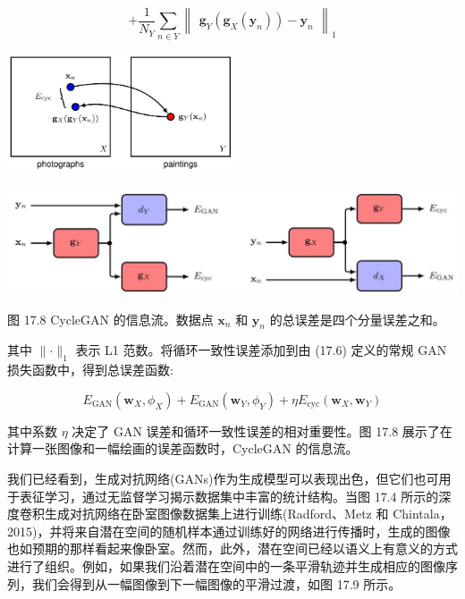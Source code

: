 \documentclass[10pt]{report}
\begin{document}
\[
+ \frac{1}{{N}_{Y}}\mathop{\sum }\limits_{{n \in  Y}}{\begin{Vmatrix}{\mathbf{g}}_{Y}\left( {\mathbf{g}}_{X}\left( {\mathbf{y}}_{n}\right) \right)  - {\mathbf{y}}_{n}\end{Vmatrix}}_{1} \tag{17.12}
\]

\begin{center}
\includegraphics[max width=0.5\textwidth]{images/0194e279-9b28-703a-88f4-c3ac21e2010d_560_831_1572_720_383_0.jpg}
\end{center}
\hspace*{3em} 

\begin{center}
\includegraphics[max width=1.0\textwidth]{images/0194e279-9b28-703a-88f4-c3ac21e2010d_561_227_342_1279_299_0.jpg}
\end{center}
\hspace*{3em} 

图 17.8 CycleGAN 的信息流。数据点 \({\mathbf{x}}_{n}\) 和 \({\mathbf{y}}_{n}\) 的总误差是四个分量误差之和。

其中 \(\parallel  \cdot  {\parallel }_{1}\) 表示 L1 范数。将循环一致性误差添加到由 (17.6) 定义的常规 GAN 损失函数中，得到总误差函数:

\[
{E}_{\mathrm{{GAN}}}\left( {{\mathbf{w}}_{X},{\phi }_{X}}\right)  + {E}_{\mathrm{{GAN}}}\left( {{\mathbf{w}}_{Y},{\phi }_{Y}}\right)  + \eta {E}_{\mathrm{{cyc}}}\left( {{\mathbf{w}}_{X},{\mathbf{w}}_{Y}}\right)  \tag{17.13}
\]

其中系数 \(\eta\) 决定了 GAN 误差和循环一致性误差的相对重要性。图 17.8 展示了在计算一张图像和一幅绘画的误差函数时，CycleGAN 的信息流。

我们已经看到，生成对抗网络(GANs)作为生成模型可以表现出色，但它们也可用于表征学习，通过无监督学习揭示数据集中丰富的统计结构。当图 17.4 所示的深度卷积生成对抗网络在卧室图像数据集上进行训练(Radford、Metz 和 Chintala，2015)，并将来自潜在空间的随机样本通过训练好的网络进行传播时，生成的图像也如预期的那样看起来像卧室。然而，此外，潜在空间已经以语义上有意义的方式进行了组织。例如，如果我们沿着潜在空间中的一条平滑轨迹并生成相应的图像序列，我们会得到从一幅图像到下一幅图像的平滑过渡，如图 17.9 所示。
\end{document}
